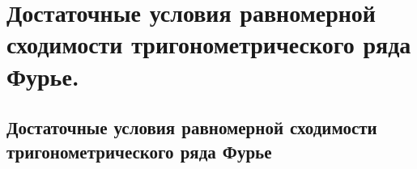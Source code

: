 \chapter{Достаточные условия равномерной сходимости тригонометрического ряда Фурье.}
\section{Достаточные условия равномерной сходимости тригонометрического ряда Фурье}